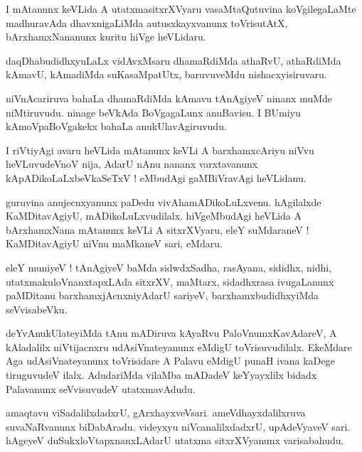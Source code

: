 \documentclass{article}
\begin{document}
\begin{mn}
I mAtanunx keVLida A utatxmasitxrXVyaru vasaMtaQutuvina koVgilegaLaMte madhuravAda dhavxnigaLiMda 
autusxkayxvanunx toVrisutAtX, bArxhamxNananunx kuritu hiVge heVLidaru.
\end{mn}

\begin{mn}
daqDhabudidhxyuLaLx vidAvxMsaru dhamaRdiMda athaRvU, athaRdiMda kAmavU, kAmadiMda suKasaMpatUtx, 
baruvuveMdu nishacxyisiruvaru.
\end{mn}

\begin{mn}
niVnAcariruva bahaLa dhamaRdiMda kAmavu tAnAgiyeV ninanx muMde niMtiruvudu. ninage beVkAda 
BoVgagaLunx anuBavisu. I BUmiyu kAmoVpaBoVgakekx bahaLa anukUlavAgiruvudu.
\end{mn}

\begin{mn}
I riVtiyAgi avaru heVLida mAtanunx keVLi A barxhamxcAriyu niVvu heVLuvudeVnoV nija, AdarU nAnu 
nananx varxtavanunx kApADikoLaLxbeVkaSeTxV ! eMbudAgi gaMBiVravAgi heVLidanu. 
\end{mn}

\begin{mn}
guruvina anujecnxyanunx paDedu vivAhamADikoLuLxvenu. hAgilalxde KaMDitavAgiyU, 
mADikoLuLxvudilalx. hiVgeMbudAgi heVLida A bArxhamxNana mAtanunx keVLi
A sitxrXVyaru, eleY suMdaraneV ! KaMDitavAgiyU niVnu maMkaneV sari, eMdaru.
\end{mn}

\begin{mn}
eleY muniyeV ! tAnAgiyeV baMda sidwdxSadha, rasAyana, sididhx, nidhi, utatxmakuloVnanxtapxLAda 
sitxrXV, maMtarx, sidadhxrasa ivugaLanunx paMDitanu barxhamxjAcnxniyAdarU sariyeV, 
barxhamxbudidhxyiMda seVvisabeVku.
\end{mn}

\begin{mn}
deYvAnukUlateyiMda tAnu mADiruva kAyaRvu PaloVnumxKavAdareV, A kAladalilx niVtijacnxru 
udAsiVnateyanunx eMdigU toVrisuvudilalx. EkeMdare Aga udAsiVnateyanunx toVrisidare A Palavu 
eMdigU punaH ivana kaDege tiruguvudeV ilalx. AdudariMda vilaMba mADadeV keYyayxlilx bidadx 
Palavanunx  seVvisuvudeV utatxmavAdudu.
\end{mn}

\begin{mn}
amaqtavu viSadalilxdadxrU, gArxhayxveVsari. ameVdhayxdalilxruva suvaNaRvanunx biDabAradu. 
videyxyu niVcanalilxdadxrU, upAdeVyaveV sari. hAgeyeV duSukxloVtapxnanxLAdarU utatxma 
sitxrXVyanunx varisabahudu.
\end{mn}
\end{document}

